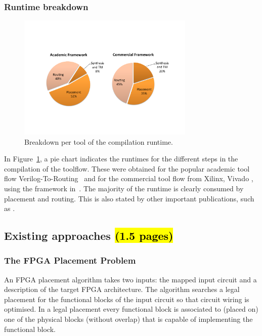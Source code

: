 \documentclass[a4paper,oneside,12pt]{article}
\begin{document}
\subsubsection{Runtime breakdown}
\begin{figure}[t]
\centering
\includegraphics[width = 0.75\textwidth,trim = 0mm 50mm 0mm 40mm, clip]{runtime_breakdown}
\caption{Breakdown per tool of the compilation runtime.}
\label{rt}
\end{figure}

In Figure~\ref{rt}, a pie chart indicates the runtimes for the different steps in the compilation of the toolflow. These were obtained for the popular academic tool flow Verilog-To-Routing~\cite{luu2014vtr} and for the commercial tool flow from Xilinx, Vivado \cite{feist2012vivado}, using the framework in~\cite{vansteenkiste2015analyzing}. The majority of the runtime is clearly consumed by placement and routing. This is also stated by other important publications, such as \cite{murray2015timing}.

\subsection{Existing approaches \hl{(1.5 pages)}}

\subsubsection{The FPGA Placement Problem}
\label{sec:placeprob}
An FPGA placement algorithm takes two inputs: the mapped input circuit and a description of the target FPGA architecture. The algorithm searches a legal placement for the functional blocks of the input circuit so that circuit wiring is optimised. In a legal placement every functional block is associated to (placed on) one of the physical blocks (without overlap) that is capable of implementing the functional block. 
\end{document}
